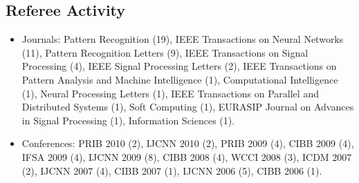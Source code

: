 \documentclass[a4paper,10pt]{article}
\begin{document}
\subsection*{Referee Activity}
\begin{itemize}
\item Journals:
  Pattern Recognition (19),
  IEEE Transactions on Neural Networks (11), 
  Pattern Recognition Letters (9),
  IEEE Transactions on Signal Processing (4), 
  IEEE Signal Processing Letters (2), 
  IEEE Transactions on Pattern Analysis and Machine Intelligence (1), 
  Computational Intelligence (1),
  Neural Processing Letters (1),
  IEEE Transactions on Parallel and Distributed Systems (1),
  Soft Computing (1),
  EURASIP Journal on Advances in Signal Processing (1),
  Information Sciences (1).
\item Conferences: 
  PRIB 2010 (2), 
  IJCNN 2010 (2), 
  PRIB 2009 (4), 
  CIBB 2009 (4), 
  IFSA 2009 (4), 
  IJCNN 2009 (8), 
  CIBB 2008 (4), 
  WCCI 2008 (3), 
  ICDM 2007 (2), 
  IJCNN 2007 (4), 
  CIBB 2007 (1), 
  IJCNN 2006 (5), 
  CIBB 2006 (1).

\end{itemize}
\end{document}
